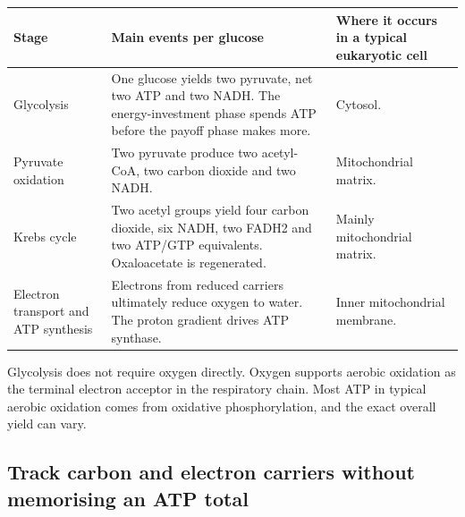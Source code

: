 \documentclass[12pt,a4paper]{article}
\begin{document}
\par\vspace{5pt}
\begingroup
\setlength{\extrarowheight}{1pt}
\noindent\begin{tabularx}{\linewidth}{|B{3.5cm}|Y|Y|}
\hline
\textbf{Stage} & \textbf{Main events per glucose} & \textbf{Where it occurs in a typical eukaryotic cell} \\ \hline
Glycolysis & One glucose yields two pyruvate, net two ATP and two NADH. The energy-investment phase spends ATP before the payoff phase makes more. & Cytosol. \\ \hline
Pyruvate oxidation & Two pyruvate produce two acetyl-CoA, two carbon dioxide and two NADH. & Mitochondrial matrix. \\ \hline
Krebs cycle & Two acetyl groups yield four carbon dioxide, six NADH, two FADH2 and two ATP/GTP equivalents. Oxaloacetate is regenerated. & Mainly mitochondrial matrix. \\ \hline
Electron transport and ATP synthesis & Electrons from reduced carriers ultimately reduce oxygen to water. The proton gradient drives ATP synthase. & Inner mitochondrial membrane. \\ \hline
\end{tabularx}\par
\endgroup
\begin{tcolorbox}[masonbox, title={Keep the roles separate}]
Glycolysis does not require oxygen directly. Oxygen supports aerobic oxidation as the terminal electron acceptor in the respiratory chain. Most ATP in typical aerobic oxidation comes from oxidative phosphorylation, and the exact overall yield can vary.
\end{tcolorbox}

\subsection{Track carbon and electron carriers without memorising an ATP total}
\begin{tcolorbox}[tikzbox, title={Carbon flow during aerobic glucose oxidation}]
\centering
{}\par
\end{tcolorbox}
\end{document}
